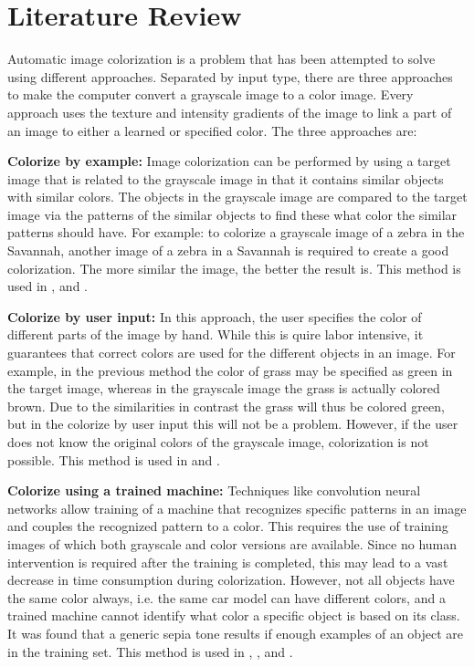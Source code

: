 \section{Literature Review} \label{sec:litreview}
Automatic image colorization is a problem that has been attempted to solve using different approaches. Separated by input type, there are three approaches to make the computer convert a grayscale image to a color image. Every approach uses the texture and intensity gradients of the image to link a part of an image to either a learned or specified color. The three approaches are:

\textbf{Colorize by example:} Image colorization can be performed by using a target image that is related to the grayscale image in that it contains similar objects with similar colors. The objects in the grayscale image are compared to the target image via the patterns of the similar objects to find these what color the similar patterns should have. For example: to colorize a grayscale image of a zebra in the Savannah, another image of a zebra in a Savannah is required to create a good colorization. The more similar the image, the better the result is. This method is used in \cite{Charpiat}, \cite{Gupta} and \cite{Zheng}.
	
\textbf{Colorize by user input:} In this approach, the user specifies the color of different parts of the image by hand. While this is quire labor intensive, it guarantees that correct colors are used for the different objects in an image. For example, in the previous method the color of grass may be specified as green in the target image, whereas in the grayscale image the grass is actually colored brown. Due to the similarities in contrast the grass will thus be colored green, but in the colorize by user input this will not be a problem. However, if the user does not know the original colors of the grayscale image, colorization is not possible. This method is used in \cite{Horiuchi} and \cite{Levin}.
	
\textbf{Colorize using a trained machine:} Techniques like convolution neural networks allow training of a machine that recognizes specific patterns in an image and couples the recognized pattern to a color. This requires the use of training images of which both grayscale and color versions are available. Since no human intervention is required after the training is completed, this may lead to a vast decrease in time consumption during colorization. However, not all objects have the same color always, i.e. the same car model can have different colors, and a trained machine cannot identify what color a specific object is based on its class. It was found that a generic sepia tone results if enough examples of an object are in the training set. This method is used in \cite{Cheng}, \cite{Ho}, \cite{Krizhevsky} and \cite{Dahl}.

